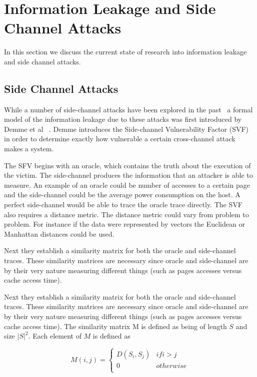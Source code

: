 \section{Information Leakage and Side Channel Attacks}

In this section we discuss the current state of research into information leakage and side channel attacks.

\subsection{Side Channel Attacks}
While a number of side-channel attacks have been explored in the past~\cite{yu_approach_2013,ristenpart_hey_2009, zhang_cross-vm_2012} a formal model of the information leakage due to these attacks was first introduced by Demme et al ~\cite{demme2012side}. Demme introduces the Side-channel Vulnerability Factor (SVF) in order to determine exactly how vulnerable a certain cross-channel attack makes a system. 

The SFV begins with an oracle, which contains the truth about the execution of the victim. The side-channel produces the information that an attacker is able to measure. An example of an oracle could be number of accesses to a certain page and the side-channel could be the average power consumption on the host. A perfect side-channel would be able to trace the oracle trace directly. The SVF also requires a distance metric. The distance metric could vary from problem to problem. For instance if the data were represented by vectors the Euclidean or Manhattan distances could be used. 


Next they establish a similarity matrix for both the oracle and side-channel traces. These similarity matrices are necessary since oracle and side-channel are by their very nature measuring different things (such as pages accesses versus cache access time).  

Next they establish a similarity matrix for both the oracle and side-channel traces. These similarity matrices are necessary since oracle and side-channel are by their very nature measuring different things (such as pages accesses versus cache access time).  The similarity matrix M is defined as being of length $S$ and size $|S|^2$.  Each element of $M$ is defined as 




\begin{equation}\label{eqn:simMatrix}
M(i,j) =  
		\begin{cases}
			D(S_i, S_j) & if i > j \\
			0 & otherwise \\
		  \end{cases}
\end{equation}

